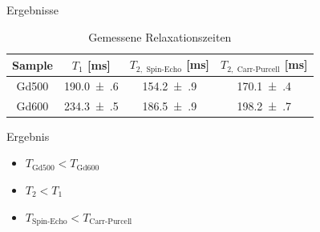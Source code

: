 \begin{frame}{Ergebnisse}
	\begin{table}
	\centering
	\begin{tabular}{cccc}
	\toprule
	Sample & $T_1$ [ms] & $T_{2,\text{ Spin-Echo}}$ [ms] & $T_{2,\text{ Carr-Purcell}}$ [ms]\\
	\midrule
	Gd500 & \num{190.0(6)} & \num{154.2(9)} & \num{170.1(4)}\\
	Gd600 & \num{234.3(5)} & \num{186.5(9)} & \num{198.2(7)}\\
	\bottomrule
	\end{tabular}
	\caption{Gemessene Relaxationszeiten}
	\end{table}
	\begin{block}{Ergebnis}
	\begin{itemize}
	\item $T_\text{Gd500} < T_\text{Gd600}$
	\item $T_2 < T_1$
	\item $T_\text{Spin-Echo} < T_\text{Carr-Purcell}$
	\end{itemize}
	\end{block}
\end{frame}
%
%
%
%
%
%
